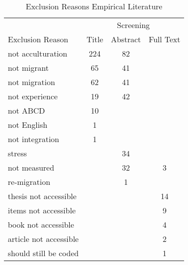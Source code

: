 \begin{table}
\begin{minipage}[t][\textheight][t]{\textwidth}

\caption{\label{tab:}Exclusion Reasons Empirical Literature}
\begin{tabular}[t]{lccc}
\toprule
\multicolumn{1}{c}{ } & \multicolumn{3}{c}{Screening} \\
\cmidrule(l{3pt}r{3pt}){2-4}
Exclusion Reason & Title & Abstract & Full Text\\
\midrule
not acculturation & 224 & 82 & \\
not migrant & 65 & 41 & \\
not migration & 62 & 41 & \\
not experience & 19 & 42 & \\
not ABCD & 10 &  & \\
not English & 1 &  & \\
not integration & 1 &  & \\
stress &  & 34 & \\
not measured &  & 32 & 3\\
re-migration &  & 1 & \\
thesis not accessible &  &  & 14\\
items not accessible &  &  & 9\\
book not accessible &  &  & 4\\
article not accessible &  &  & 2\\
should still be coded &  &  & 1\\
\bottomrule
\end{tabular}
\end{minipage}
\end{table}
